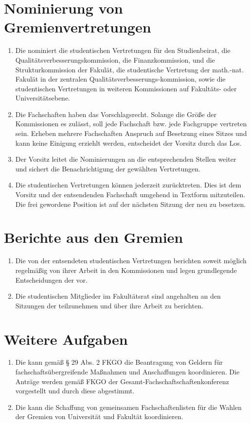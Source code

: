 \documentclass{article}
\begin{document}
	\section{Nominierung von Gremienvertretungen}
	\begin{enumerate}[(1)]
		\setlength\itemsep{0pt}
		\item Die \mnfk nominiert die studentischen Vertretungen für den Studienbeirat, die Qualitätsverbesserungskommission, die Finanzkommission, und die Strukturkommission der Fakulät, die studentische Vertretung der math.-nat. Fakulät in der zentralen Qualitätsverbesserungs-\linebreak kommission, sowie die studentischen Vertretungen in weiteren Kommissionen auf Fakultäts- oder Universitätsebene.
		\item Die Fachschaften haben das Vorschlagsrecht. Solange die Größe der Kommissionen es zulässt, soll jede Fachschaft bzw. jede Fachgruppe vertreten sein. Erheben mehrere Fachschaften Anspruch auf Besetzung eines Sitzes und kann keine Einigung erziehlt werden, entscheidet der Vorsitz durch das Los.
		\item Der Vorsitz leitet die Nominierungen an die entsprechenden Stellen weiter und sichert die Benachrichtigung der gewählten Vertretungen.
		\item Die studentischen Vertretungen können jederzeit zurücktreten. Dies ist dem Vorsitz und der entsendenden Fachschaft umgehend in Textform mitzuteilen. Die frei gewordene Position ist auf der nächsten Sitzung der \mnfk neu zu besetzen.
	\end{enumerate}
	\section{Berichte aus den Gremien}
	\begin{enumerate}[(1)]
		\setlength\itemsep{0pt}
		\item Die von der \mnfk entsendeten studentischen Vertretungen berichten soweit möglich regelmäßig von ihrer Arbeit in den Kommissionen und legen grundlegende Entscheidungen der \mnfk vor.
		\item Die studentischen Mitglieder im Fakultätsrat sind angehalten an den Sitzungen der \mnfk teilzunehmen und über ihre Arbeit zu berichten.
	\end{enumerate}
	\section{Weitere Aufgaben}
	\begin{enumerate}[(1)]
		\setlength\itemsep{0pt}
		\item Die \mnfk kann gemäß § 29 Abs. 2 FKGO die Beantragung von Geldern für fachschaftsübergreifende Maßnahmen und Anschaffungen koordinieren. Die Anträge werden gemäß FKGO der Gesamt-Fachschaftschaftenkonferenz vorgestellt und durch diese abgestimmt.
		\item Die \mnfk kann die Schaffung von gemeinsamen Fachschaftenlisten für die Wahlen der Gremien von Universität und Fakultät koordinieren.
	\end{enumerate}
\end{document}
